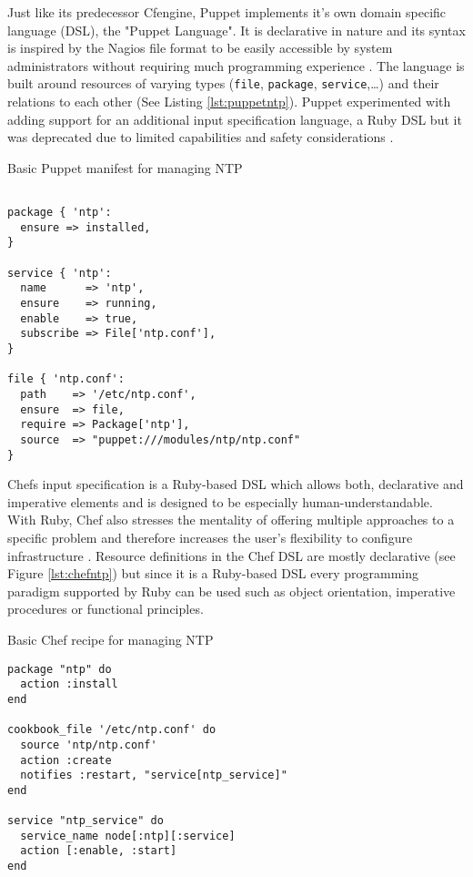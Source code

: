 Just like its predecessor Cfengine, Puppet implements it's own domain specific language (DSL), the "Puppet Language". It is declarative in nature and its syntax is inspired by the Nagios file format to be easily accessible by system administrators without requiring much programming experience \cite{puppetcomlangsum}. The language is built around resources of varying types (\texttt{file}, \texttt{package}, \texttt{service},\ldots) and their relations to each other (See Listing \ref{lst:puppetntp}). Puppet experimented with adding support for an additional input specification language, a Ruby DSL but it was deprecated due to limited capabilities and safety considerations \cite{puppetrubydsl}.

\begin{listing}[h]
\caption{Basic Puppet manifest for managing NTP}
\label{lst:puppetntp}
\begin{verbatim}

package { 'ntp':
  ensure => installed,
}

service { 'ntp':
  name      => 'ntp',
  ensure    => running,
  enable    => true,
  subscribe => File['ntp.conf'],
}

file { 'ntp.conf':
  path    => '/etc/ntp.conf',
  ensure  => file,
  require => Package['ntp'],
  source  => "puppet:///modules/ntp/ntp.conf"
}
\end{verbatim}
\end{listing}



Chefs input specification is a Ruby-based DSL \cite{pandey2012investigating} which allows both, declarative and imperative elements and is designed to be especially human-understandable. With Ruby, Chef also stresses the mentality of offering multiple approaches to a specific problem and therefore increases the user's flexibility to configure infrastructure \cite{chefiorecipe}. Resource definitions in the Chef DSL are mostly declarative (see Figure \ref{lst:chefntp}) but since it is a Ruby-based DSL every programming paradigm supported by Ruby can be used such as object orientation, imperative procedures or functional principles.

\begin{listing}[H]
\caption{Basic Chef recipe for managing NTP}
\label{lst:chefntp}
\begin{verbatim}
package "ntp" do
  action :install
end

cookbook_file '/etc/ntp.conf' do
  source 'ntp/ntp.conf'
  action :create
  notifies :restart, "service[ntp_service]"
end

service "ntp_service" do
  service_name node[:ntp][:service]
  action [:enable, :start]
end
\end{verbatim}
\end{listing}

